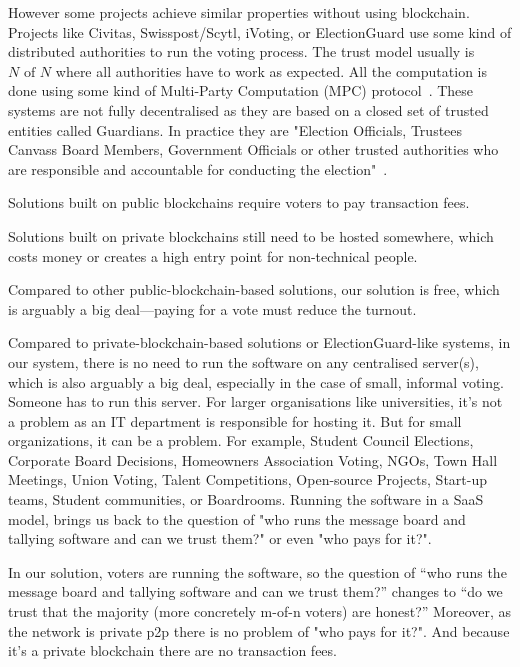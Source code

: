 \documentclass{article}
\begin{document}
However some projects achieve similar properties without using blockchain. Projects like Civitas, Swisspost/Scytl, iVoting, or ElectionGuard use some kind of distributed authorities to run the voting process. The trust model usually is $N \textrm{ of } N$ where all authorities have to work as expected. All the computation is done using some kind of Multi-Party Computation (MPC) protocol~\cite{boweMultipartyProtocolConstructing2018}.
These systems are not fully decentralised as they are based on a closed set of trusted entities called Guardians. In practice they are "Election Officials, Trustees Canvass Board Members, Government Officials or other trusted authorities who are responsible and accountable for conducting the election"~\cite{ElectionGuardWhoGuardian}.


Solutions built on public blockchains require voters to pay transaction fees.

Solutions built on private blockchains still need to be hosted somewhere, which costs money or creates a high entry point for non-technical people.

Compared to other public-blockchain-based solutions, our solution is free, which is arguably a big deal—paying for a vote must reduce the turnout.

Compared to private-blockchain-based solutions or ElectionGuard-like systems, in our system, there is no need to run the software on any centralised server(s), which is also arguably a big deal, especially in the case of small, informal voting. Someone has to run this server. For larger organisations like universities, it's not a problem as an IT department is responsible for hosting it. But for small organizations, it can be a problem. For example, Student Council Elections, Corporate Board Decisions, Homeowners Association Voting, NGOs, Town Hall Meetings, Union Voting, Talent Competitions, Open-source Projects, Start-up teams, Student communities, or Boardrooms. Running the software in a SaaS model, brings us back to the question of "who runs the message board and tallying software and can we trust them?" or even "who pays for it?".

In our solution, voters are running the software, so the question of “who runs the message board and tallying software and can we trust them?” changes to “do we trust that the majority (more concretely m-of-n voters) are honest?” Moreover, as the network is private p2p there is no problem of "who pays for it?". And because it's a private blockchain there are no transaction fees.
\end{document}
